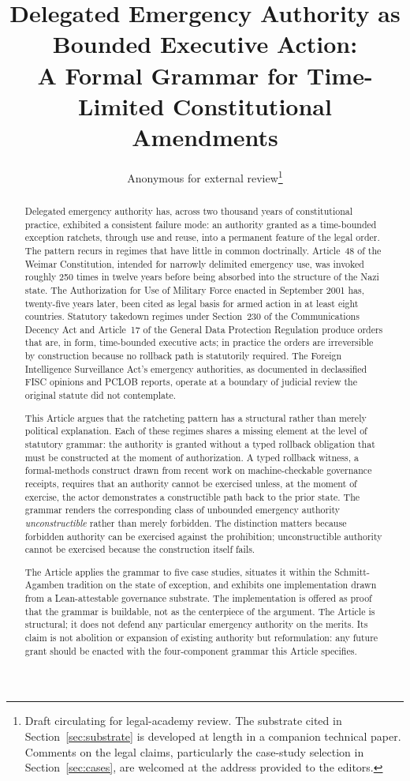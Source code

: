 \documentclass[11pt]{article}
\title{\large\bfseries Delegated Emergency Authority as Bounded Executive Action:\\
A Formal Grammar for Time-Limited Constitutional Amendments}
\author{Anonymous for external review\thanks{Draft circulating for legal-academy review.
The substrate cited in Section~\ref{sec:substrate} is developed at length in a companion technical paper.
Comments on the legal claims, particularly the case-study selection in Section~\ref{sec:cases},
are welcomed at the address provided to the editors.}}
\date{}
\begin{document}
\maketitle

\begin{abstract}
\noindent
Delegated emergency authority has, across two thousand years of constitutional practice,
exhibited a consistent failure mode: an authority granted as a time-bounded exception ratchets,
through use and reuse, into a permanent feature of the legal order.
The pattern recurs in regimes that have little in common doctrinally.
Article~48 of the Weimar Constitution, intended for narrowly delimited emergency use,
was invoked roughly 250 times in twelve years before being absorbed into the structure of the Nazi state.
The Authorization for Use of Military Force enacted in September 2001 has, twenty-five years later,
been cited as legal basis for armed action in at least eight countries.
Statutory takedown regimes under Section~230 of the Communications Decency Act and Article~17 of the
General Data Protection Regulation produce orders that are, in form, time-bounded executive acts;
in practice the orders are irreversible by construction because no rollback path is statutorily required.
The Foreign Intelligence Surveillance Act's emergency authorities, as documented in declassified
FISC opinions and PCLOB reports, operate at a boundary of judicial review the original statute did not contemplate.

This Article argues that the ratcheting pattern has a structural rather than merely political explanation.
Each of these regimes shares a missing element at the level of statutory grammar:
the authority is granted without a typed rollback obligation that must be constructed
at the moment of authorization.
A typed rollback witness, a formal-methods construct drawn from recent work on
machine-checkable governance receipts, requires that an authority cannot be exercised unless,
at the moment of exercise, the actor demonstrates a constructible path back to the prior state.
The grammar renders the corresponding class of unbounded emergency authority \emph{unconstructible}
rather than merely forbidden.
The distinction matters because forbidden authority can be exercised against the prohibition;
unconstructible authority cannot be exercised because the construction itself fails.

The Article applies the grammar to five case studies, situates it within the Schmitt-Agamben
tradition on the state of exception, and exhibits one implementation drawn from a Lean-attestable
governance substrate.
The implementation is offered as proof that the grammar is buildable, not as the centerpiece of the argument.
The Article is structural; it does not defend any particular emergency authority on the merits.
Its claim is not abolition or expansion of existing authority but reformulation:
any future grant should be enacted with the four-component grammar this Article specifies.
\end{abstract}












\end{document}
